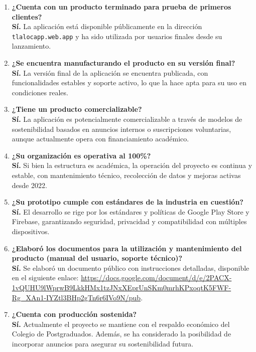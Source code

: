 \begin{enumerate}
\item \textbf{¿Cuenta con un producto terminado para prueba de primeros clientes?} \\
\textbf{Sí.} La aplicación está disponible públicamente en la dirección \texttt{tlalocapp.web.app} y ha sido utilizada por usuarios finales desde su lanzamiento.

\item \textbf{¿Se encuentra manufacturando el producto en su versión final?} \\
\textbf{Sí.} La versión final de la aplicación se encuentra publicada, con funcionalidades estables y soporte activo, lo que la hace apta para su uso en condiciones reales.

\item \textbf{¿Tiene un producto comercializable?} \\
\textbf{Sí.} La aplicación es potencialmente comercializable a través de modelos de sostenibilidad basados en anuncios internos o suscripciones voluntarias, aunque actualmente opera con financiamiento académico.

\item \textbf{¿Su organización es operativa al 100\%?} \\
\textbf{Sí.} Si bien la estructura es académica, la operación del proyecto es continua y estable, con mantenimiento técnico, recolección de datos y mejoras activas desde 2022.

\item \textbf{¿Su prototipo cumple con estándares de la industria en cuestión?} \\
\textbf{Sí.} El desarrollo se rige por los estándares y políticas de Google Play Store y Firebase, garantizando seguridad, privacidad y compatibilidad con múltiples dispositivos.

\item \textbf{¿Elaboró los documentos para la utilización y mantenimiento del producto (manual del usuario, soporte técnico)?} \\
\textbf{Sí.} Se elaboró un documento público con instrucciones detalladas, disponible en el siguiente enlace: \url{https://docs.google.com/document/d/e/2PACX-1vQUHU9lWprwB9LkkHMx1tzJNxXEprUnSKm0mrhKPxoqtK5FWF-Rg_XAn1-IYZtl3BHp2gTn6r6IVo9N/pub}.

\item \textbf{¿Cuenta con producción sostenida?} \\
\textbf{Sí.} Actualmente el proyecto se mantiene con el respaldo económico del Colegio de Postgraduados. Además, se ha considerado la posibilidad de incorporar anuncios para asegurar su sostenibilidad futura.


\end{enumerate}
